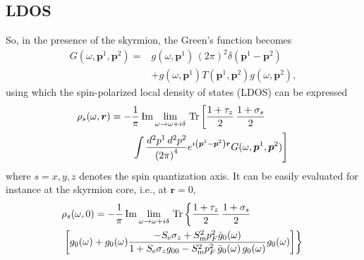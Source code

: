 \documentclass[twocolumn,showpacs,floatfix,nofootinbib,longbibliography]{revtex4-1}
\begin{document}
\subsection{LDOS} \label{sec:LDOS}
So, in the presence of the skyrmion, the Green's function becomes
\begin{align}
	G(\omega,\bm p^1,\bm p^2) =& g(\omega,\bm p^1)\,(2\pi)^2\delta(\bm p^1-\bm p^2) \nonumber \\
	          &  +g(\omega,\bm p^1) T(\bm p^1,\bm p^2) g(\omega,\bm p^2),
	\label{G}
\end{align}
using which the spin-polarized local density of states (LDOS) can be expressed
\begin{align}
	\rho_s(\omega,\bm r) = -&\frac{1}{\pi}\,{\rm Im}\lim_{\omega\rightarrow \omega+i\delta}{\rm\,Tr} \left[ \frac{1+\tau_z}{2}\,\frac{1+\sigma_s}{2} \right. \label{rhor} \\
	&\left.\int \frac{d^2p^1\,d^2p^2}{\left( 2\pi \right)^4} e^{i\left( \bm p^1-\bm p^2 \right)\bm r} G(\omega,\bm p^1,\bm p^2)\right]\, \nonumber
\end{align}
where $s=x,y,z$ denotes the spin quantization axis. It can be easily evaluated for instance at the skyrmion core, i.e., at $\bm r=0$,
\begin{align}
	& \rho_s(\omega,0) = -\frac{1}{\pi}\,{\rm Im}\lim_{\omega\rightarrow \omega+i\delta}{\rm \,Tr} \left\{  \frac{1+\tau_z}{2}\,\frac{1+\sigma_s}{2}  \right. \label{spldos} \\
	&\left.\left[g_0(\omega)+g_0(\omega)  \frac{-S_{\rm e}\sigma_z+S^2_{\rm m}p_F^2\bar g_{0}(\omega)}{1+S_{\rm e}\sigma_zg_{00}-S^2_{\rm m}p_F^2\,\bar g_{0}(\omega)\, g_{0}(\omega)} g_0(\omega)  \right]\right\}\, \nonumber
\end{align}
\end{document}
